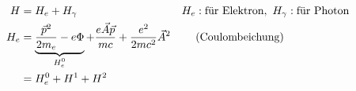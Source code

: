 		\begin{align*}
			H &= H_e + H_\gamma & H_e &: \text{für Elektron}, ~ H_\gamma : \text{für Photon} \\
			H_e &= \underbrace{\frac{\vec{p}^2}{2 m_e} - e \Phi}_{\mathclap{H_e^0}}
			+ \frac{e \vec{A} \vec{p}}{m c}
			+ \frac{e^2}{2 m c^2} \vec{A}^2 &
			&\text{(Coulombeichung)}\\
			&= H_e^0 + H^1 + H^2
		\end{align*}